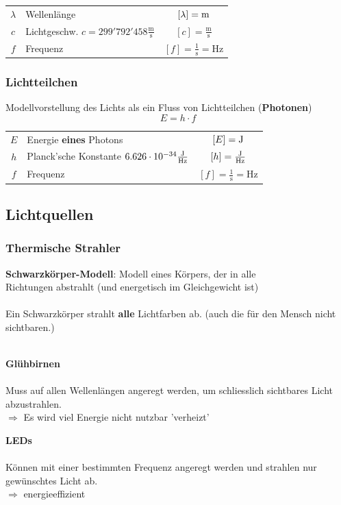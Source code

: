 \begin{tabular}{c l c}
	$\lambda$ & Wellenlänge & $[\lambda] = \mathrm{m}$ \\
	$c$ & Lichtgeschw. $c = 299'792'458 \mathrm{\frac{m}{s}}$ & $[c] = \mathrm{\frac{m}{s}}$ \\
	$f$ & Frequenz & $[f] = \mathrm{\frac{1}{s} = Hz}$ \\
\end{tabular}




\subsubsection{Lichtteilchen}

Modellvorstellung des Lichts als ein Fluss von Lichtteilchen (\textbf{Photonen}) \\


$$ \boxed{ E = h \cdot f } $$

\begin{tabular}{c l c}
	$E$ & Energie \textbf{eines} Photons & $[E] = \mathrm{J}$ \\
	$h$ & Planck'sche Konstante $6.626 \cdot 10^{-34} \frac{\mathrm{J}}{\mathrm{Hz}}$ & $[h] = \frac{\mathrm{J}}{\mathrm{Hz}}$ \\
	$f$ & Frequenz & $[f] = \mathrm{\frac{1}{s} = Hz}$ \\
\end{tabular}



\subsection{Lichtquellen}

\subsubsection{Thermische Strahler}

\textbf{Schwarzkörper-Modell}: Modell eines Körpers, der in alle \\
Richtungen abstrahlt (und energetisch im Gleichgewicht ist) \\
\\
Ein Schwarzkörper strahlt \textbf{alle} Lichtfarben ab. (auch die für den Mensch nicht sichtbaren.) \\
\\

\begin{minipage}{0.48\linewidth}
\textbf{Glühbirnen} \\
\\
Muss auf allen Wellenlängen angeregt werden, um schliesslich sichtbares Licht abzustrahlen. \\
$\Rightarrow$ Es wird viel Energie nicht nutzbar 'verheizt'
\end{minipage}
\hfill
\begin{minipage}{0.48\linewidth}
\textbf{LEDs} \\
\\
Können mit einer bestimmten Frequenz angeregt werden und strahlen nur gewünschtes Licht ab. \\
$\Rightarrow$ energieeffizient
\end{minipage}



